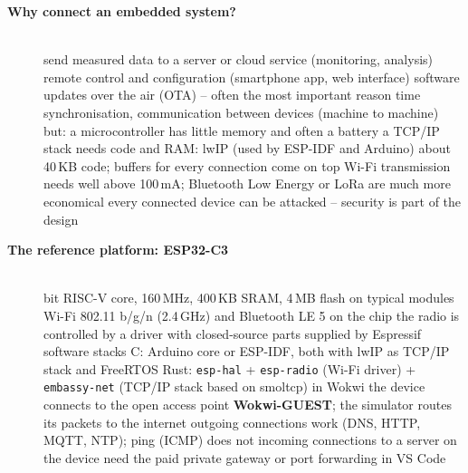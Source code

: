 \begin{description}
\item[{\rot\bf Why connect an embedded system?}]~\\[-\lblskip]
\bi
	\ite send measured data to a server or cloud service (monitoring, analysis)
	\ite remote control and configuration (smartphone app, web interface)
	\ite software updates over the air (OTA) -- often the most important reason
	\ite time synchronisation, communication between devices (machine to machine)
\ei
\bi
	\ite but: a microcontroller has little memory and often a battery
	\bi
		\ite a TCP/IP stack needs code and RAM: lwIP (used by ESP-IDF and Arduino) about 40\,KB code; buffers for every connection come on top
		\ite Wi-Fi transmission needs well above 100\,mA; Bluetooth Low Energy or LoRa are much more economical
		\ite every connected device can be attacked -- security is part of the design
	\ei
\ei
\os{\newpage}

\item[{\rot\bf The reference platform: ESP32-C3}]~\\[-\lblskip]
\bi
	 bit RISC-V core, 160\,MHz, 400\,KB SRAM, 4\,MB flash on typical modules
	\ite Wi-Fi 802.11 b/g/n (2.4\,GHz) and Bluetooth LE 5 on the chip
	\ite the radio is controlled by a driver with closed-source parts supplied by Espressif
	\ite software stacks
	\bi
		\ite C: Arduino core or ESP-IDF, both with lwIP as TCP/IP stack and FreeRTOS
		\ite Rust: \texttt{esp-hal} + \texttt{esp-radio} (Wi-Fi driver) + \texttt{embassy-net} (TCP/IP stack based on smoltcp)
	\ei
	\ite in Wokwi the device connects to the open access point \textbf{Wokwi-GUEST}; the simulator routes its packets to the internet
	\bi
		\ite outgoing connections work (DNS, HTTP, MQTT, NTP); ping (ICMP) does not
		\ite incoming connections to a server on the device need the paid private gateway or port forwarding in VS Code
	\ei
\ei
\os{\newpage}


\end{description}
